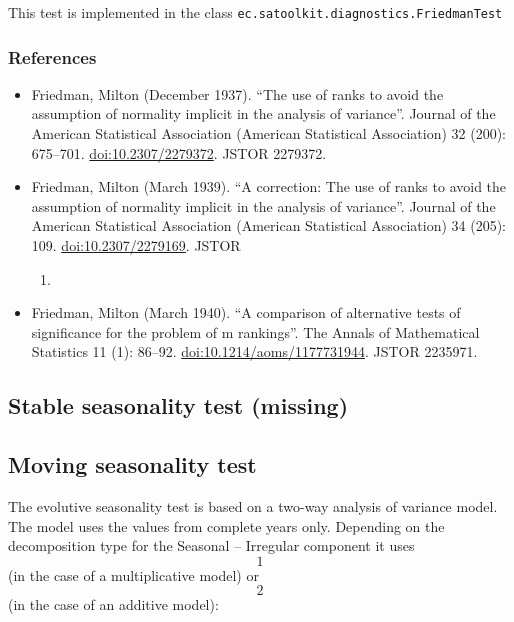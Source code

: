 \documentclass[
  letterpaper,
  DIV=11,
  numbers=noendperiod]{scrreprt}
\providecommand{\tightlist}{%
  \setlength{\itemsep}{0pt}\setlength{\parskip}{0pt}}\usepackage{longtable,booktabs,array}
\begin{document}
This test is implemented in the class
\texttt{ec.satoolkit.diagnostics.FriedmanTest}

\hypertarget{references-2}{%
\subsubsection{References}\label{references-2}}

\begin{itemize}
\item
  Friedman, Milton (December 1937). ``The use of ranks to avoid the
  assumption of normality implicit in the analysis of variance''.
  Journal of the American Statistical Association (American Statistical
  Association) 32 (200): 675--701. \url{doi:10.2307/2279372}. JSTOR
  2279372.
\item
  Friedman, Milton (March 1939). ``A correction: The use of ranks to
  avoid the assumption of normality implicit in the analysis of
  variance''. Journal of the American Statistical Association (American
  Statistical Association) 34 (205): 109. \url{doi:10.2307/2279169}.
  JSTOR

  \begin{enumerate}
  \def\labelenumi{\arabic{enumi}.}
  \setcounter{enumi}{2279168}
  \tightlist
  \item
  \end{enumerate}
\item
  Friedman, Milton (March 1940). ``A comparison of alternative tests of
  significance for the problem of m rankings''. The Annals of
  Mathematical Statistics 11 (1): 86--92.
  \url{doi:10.1214/aoms/1177731944}. JSTOR 2235971.
\end{itemize}

\hypertarget{stable-seasonality-test-missing}{%
\subsection{Stable seasonality test
(missing)}\label{stable-seasonality-test-missing}}

\hypertarget{moving-seasonality-test}{%
\subsection{Moving seasonality test}\label{moving-seasonality-test}}

The evolutive seasonality test is based on a two-way analysis of
variance model. The model uses the values from complete years only.
Depending on the decomposition type for the Seasonal -- Irregular
component it uses \[1\] (in the case of a multiplicative model) or \[2\]
(in the case of an additive model):
\end{document}
